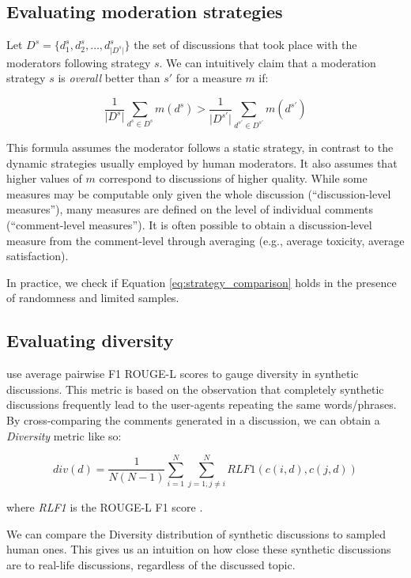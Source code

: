 \subsection{Evaluating moderation strategies}
\label{ssec:methodology:strategies}

Let $D^{s} = \{d^s_1, d^s_2, \ldots, d^s_{\lvert D^s \rvert}\}$  the set of discussions that took place with the moderators following strategy $s$. We can intuitively claim that a moderation strategy $s$ is \textit{overall} better than $s'$ for a measure $m$ if:

\begin{equation}
\label{eq:strategy_comparison}
    \frac{1}{\lvert D^{s} \rvert} {\sum_{d^{s} \in D^{s}} m(d^{s})} > \frac{1}{\lvert D^{s'} \rvert} {\sum_{d^{s'} \in D^{s'}} m(d^{s'})}
\end{equation}

This formula assumes the moderator follows a static strategy, in contrast to the dynamic strategies usually employed by human moderators. It also assumes that higher values of $m$ correspond to discussions of higher quality. While some measures may be computable only given the whole discussion (“discussion-level measures”), many measures are defined on the level of individual comments (“comment-level measures”). It is often possible to obtain a discussion-level measure from the comment-level through averaging (e.g., average toxicity, average satisfaction).

In practice, we check if Equation \ref{eq:strategy_comparison} holds in the presence of randomness and limited samples.


\subsection{Evaluating diversity}
\label{ssec:methodology:diversity}

\citet{ulmer2024} use average pairwise F1 ROUGE-L scores \cite{lin-2004-rouge} to gauge diversity in synthetic discussions. This metric is based on the observation that completely synthetic discussions frequently lead to the user-agents repeating the same words/phrases. By cross-comparing the comments generated in a discussion, we can obtain a \textit{Diversity} metric like so:

\small
\begin{equation}
\label{eq:variety}
    div(d) = \frac{1}{N(N-1)} \sum_{i=1}^N \sum_{j=1, j \neq i}^N \textit{RLF1}(c(i, d), c(j, d))
\end{equation}
\normalsize

\noindent where \textit{RLF1} is the ROUGE-L F1 score \cite{lin-2004-rouge}.

We can compare the Diversity distribution of synthetic discussions to sampled human ones. This gives us an intuition on how close these synthetic discussions are to real-life discussions, regardless of the discussed topic.